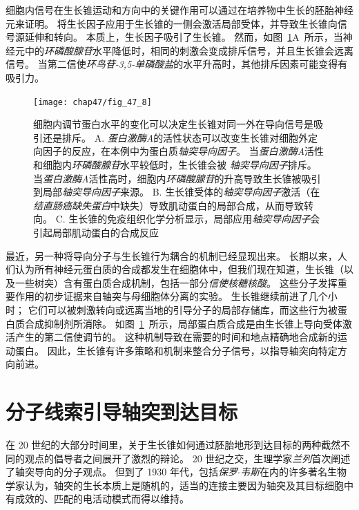 细胞内信号在生长锥运动和方向中的关键作用可以通过在培养物中生长的胚胎神经元来证明。
将生长因子应用于生长锥的一侧会激活局部受体，并导致生长锥向信号源延伸和转向。
本质上，生长因子吸引了生长锥。
然而，如图~\ref{fig:47_8}A~所示，当神经元中的\textit{环磷酸腺苷}水平降低时，相同的刺激会变成排斥信号，并且生长锥会远离信号。
当第二信使\textit{环鸟苷-3,5-单磷酸盐}的水平升高时，其他排斥因素可能变得有吸引力。


\begin{figure}[htbp]
	\centering
	\texttt{[image: chap47/fig\_47\_8]}
	\caption{细胞内调节蛋白水平的变化可以决定生长锥对同一外在导向信号是吸引还是排斥。
		A. \textit{蛋白激酶A}的活性状态可以改变生长锥对细胞外定向因子的反应，在本例中为蛋白质\textit{轴突导向因子}。
		当\textit{蛋白激酶A}活性和细胞内\textit{环磷酸腺苷}水平较低时，生长锥会被 \textit{轴突导向因子}排斥。
		当\textit{蛋白激酶A}活性高时，细胞内\textit{环磷酸腺苷}的升高导致生长锥被吸引到局部\textit{轴突导向因子}来源\cite{ming1997camp}。
		B. 生长锥受体的\textit{轴突导向因子}激活（在\textit{结直肠癌缺失蛋白}中缺失）导致肌动蛋白的局部合成，从而导致转向。
		C. 生长锥的免疫组织化学分析显示，局部应用\textit{轴突导向因子}会引起局部肌动蛋白的合成反应\cite{leung2006asymmetrical} }
	\label{fig:47_8}
\end{figure}


最近，另一种将导向分子与生长锥行为耦合的机制已经显现出来。
长期以来，人们认为所有神经元蛋白质的合成都发生在细胞体中，但我们现在知道，生长锥（以及一些树突）含有蛋白质合成机制，包括一部分\textit{信使核糖核酸}。
这些分子发挥重要作用的初步证据来自轴突与母细胞体分离的实验。
生长锥继续前进了几个小时； 它们可以被刺激转向或远离当地的引导分子的局部存储库，而这些行为被蛋白质合成抑制剂所消除。
如图~\ref{fig:47_8}~所示，局部蛋白质合成是由生长锥上导向受体激活产生的第二信使调节的。
这种机制导致在需要的时间和地点精确地合成新的运动蛋白。
因此，生长锥有许多策略和机制来整合分子信号，以指导轴突向特定方向前进。



\section{分子线索引导轴突到达目标}

在 20 世纪的大部分时间里，关于生长锥如何通过胚胎地形到达目标的两种截然不同的观点的倡导者之间展开了激烈的辩论。
20 世纪之交，生理学家\textit{兰列}首次阐述了轴突导向的分子观点。
但到了 1930 年代，包括\textit{保罗$\cdot$韦斯}在内的许多著名生物学家认为，轴突的生长本质上是随机的，适当的连接主要因为轴突及其目标细胞中有成效的、匹配的电活动模式而得以维持。


